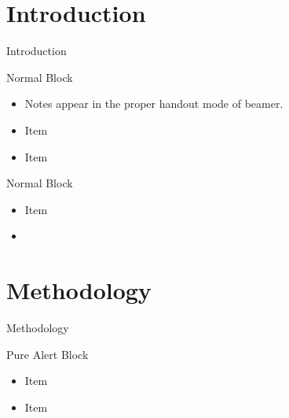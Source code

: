 \usepackage{lipsum}

\maketitle

\mode*

\section{Introduction}

\begin{frame}{Introduction}
  \begin{block}{Normal Block}
    \begin{itemize}
    \item Notes appear in the proper handout mode of beamer.
    \item Item
    \item Item
    \end{itemize}
  \end{block}

  \begin{block}{Normal Block}
    \begin{itemize}
    \item Item
    \item {}
    \end{itemize}
  \end{block}
\end{frame}


\lipsum[1]

\section{Methodology}

\begin{frame}{Methodology}
  \begin{alert}{Pure Alert Block}
    \begin{itemize}
    \item Item
    \item Item
    \end{itemize}
  \end{alert}
\end{frame}

\lipsum[2-4]

